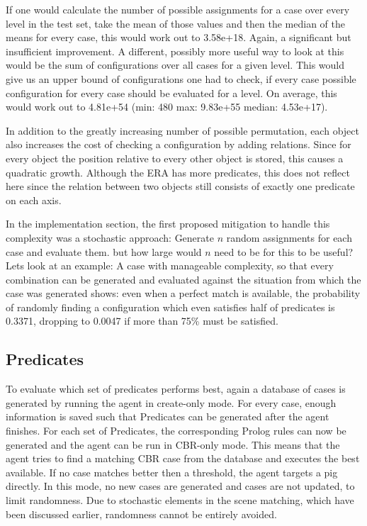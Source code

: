 If one would calculate the number of possible assignments for a case over every level in the test set, take the mean of those values and then the median of the means for every case, this would work out to 3.58e+18. Again, a significant but insufficient improvement.
A different, possibly more useful way to look at this would be the sum of configurations over all cases for a given level. This would give us an upper bound of configurations one had to check, if every case possible configuration for every case should be evaluated for a level. On average, this would work out to 4.81e+54 (min: 480 max: 9.83e+55 median: 4.53e+17).

In addition to the greatly increasing number of possible permutation, each object also increases the cost of checking a configuration by adding relations.
Since for every object the position relative to every other object is stored, this causes a quadratic growth. Although the ERA has more predicates, this does not reflect here since the relation between two objects still consists of exactly one predicate on each axis.

In the implementation section, the first proposed mitigation to handle this complexity was a stochastic approach: Generate $n$ random assignments for each case and evaluate them. but how large would $n$ need to be for this to be useful?
Lets look at an example: A case with manageable complexity, so that every combination can be generated and evaluated against the situation from which the case was generated shows: even when a perfect match is available, the probability of randomly finding a configuration which even satisfies half of predicates is 0.3371, dropping to 0.0047 if more than 75\% must be satisfied.




\subsection{Predicates}\label{subsec:experimental-predicates}
To evaluate which set of predicates performs best, again a database of cases is generated by running the agent in create-only mode.
For every case, enough information is saved such that Predicates can be generated after the agent finishes. For each set of Predicates, the corresponding Prolog rules can now be generated and the agent can be run in CBR-only mode. This means that the agent tries to find a matching CBR case from the database and executes the best available. If no case matches better then a threshold, the agent targets a pig directly. In this mode, no new cases are generated and cases are not updated, to limit randomness. Due to stochastic elements in the scene matching, which have been discussed earlier, randomness cannot be entirely avoided.

